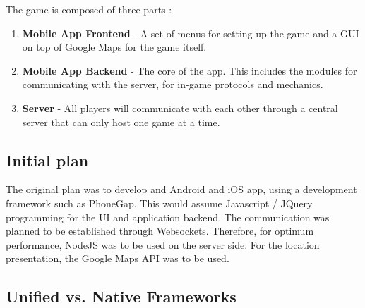 \documentclass{article}
\begin{document}
The game is composed of three parts : \newline
\begin{enumerate}
  \item \textbf{Mobile App Frontend} - A set of menus for setting up the game
  and a GUI on top of Google Maps for the game itself.
  \item \textbf{Mobile App Backend} - The core of the app. This includes the
  modules for communicating with the server, for in-game protocols and
  mechanics.
  \item \textbf{Server} - All players will communicate with each other through a
  central server that can only host one game at a time.  
\end{enumerate}


\subsection{Initial plan}

The original plan was to develop and Android and iOS app, using a development
framework such as PhoneGap. This would assume Javascript / JQuery programming
for the UI and application backend. The communication was planned to be
established through Websockets. Therefore, for optimum performance, NodeJS was
to be used on the server side. For the location presentation, the Google Maps
API was to be used.

\subsection{Unified vs. Native Frameworks}
\end{document}
